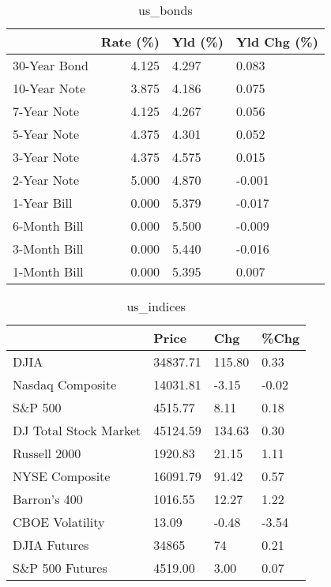 \documentclass{article}%
\begin{document}
%


\begin{table}[htbp]%
\caption{us\_bonds}%
\centering%
\begin{adjustbox}{width=1\textwidth}%
\begin{tabular}{lrll}
\toprule
             &  Rate (\%) & Yld (\%) & Yld Chg (\%) \\
\midrule
30-Year Bond &     4.125 &   4.297 &       0.083 \\
10-Year Note &     3.875 &   4.186 &       0.075 \\
 7-Year Note &     4.125 &   4.267 &       0.056 \\
 5-Year Note &     4.375 &   4.301 &       0.052 \\
 3-Year Note &     4.375 &   4.575 &       0.015 \\
 2-Year Note &     5.000 &   4.870 &      -0.001 \\
 1-Year Bill &     0.000 &   5.379 &      -0.017 \\
6-Month Bill &     0.000 &   5.500 &      -0.009 \\
3-Month Bill &     0.000 &   5.440 &      -0.016 \\
1-Month Bill &     0.000 &   5.395 &       0.007 \\
\bottomrule
\end{tabular}
%
\end{adjustbox}%
\end{table}

%


\begin{table}[htbp]%
\caption{us\_indices}%
\centering%
\begin{adjustbox}{width=1\textwidth}%
\begin{tabular}{llll}
\toprule
                      &    Price &    Chg &  \%Chg \\
\midrule
                 DJIA & 34837.71 & 115.80 &  0.33 \\
     Nasdaq Composite & 14031.81 &  -3.15 & -0.02 \\
              S\&P 500 &  4515.77 &   8.11 &  0.18 \\
DJ Total Stock Market & 45124.59 & 134.63 &  0.30 \\
         Russell 2000 &  1920.83 &  21.15 &  1.11 \\
       NYSE Composite & 16091.79 &  91.42 &  0.57 \\
         Barron's 400 &  1016.55 &  12.27 &  1.22 \\
      CBOE Volatility &    13.09 &  -0.48 & -3.54 \\
         DJIA Futures &    34865 &     74 &  0.21 \\
      S\&P 500 Futures &  4519.00 &   3.00 &  0.07 \\
\bottomrule
\end{tabular}
%
\end{adjustbox}%
\end{table}
\end{document}

